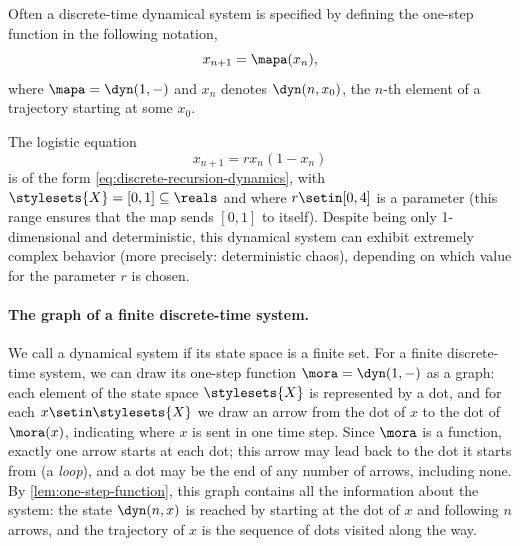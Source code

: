 Often a discrete-time dynamical system is specified by defining the one-step function in the following notation,
\begin{equation}\label{eq:discrete-recursion-dynamics}
    x_{n+1} = \mapa(x_n),
\end{equation}
where $\mapa = \dyn(1, - )$ and $x_n$ denotes $\dyn(n, x_0)$, the $n$-th element of a trajectory starting at some $x_0$.

\begin{example} The logistic equation
    \begin{equation}
        x_{n+1} = rx_n(1 - x_n)
    \end{equation}
    is of the form \cref{eq:discrete-recursion-dynamics}, with $\stylesets{X} = [0,1] \subseteq \reals$ and where $r \setin [0,4]$ is a parameter (this range ensures that the map sends $[0,1]$ to itself).
    Despite being only 1-dimensional and deterministic, this dynamical system can exhibit extremely complex behavior (more precisely: deterministic chaos), depending on which value for the parameter $r$ is chosen.
\end{example}



\paragraph{The graph of a finite discrete-time system.}
We call a dynamical system  if its state space is a finite set.
For a finite discrete-time system, we can draw its one-step function $\mora = \dyn(1, -)$ as a graph: each element of the state space $\stylesets{X}$ is represented by a dot, and for each $x \setin \stylesets{X}$ we draw an arrow from the dot of $x$ to the dot of $\mora(x)$, indicating where $x$ is sent in one time step.
Since $\mora$ is a function, exactly one arrow starts at each dot; this arrow may lead back to the dot it starts from (a \emph{loop}), and a dot may be the end of any number of arrows, including none.
By \cref{lem:one-step-function}, this graph contains all the information about the system: the state $\dyn(n, x)$ is reached by starting at the dot of $x$ and following $n$ arrows, and the trajectory of $x$ is the sequence of dots visited along the way.

